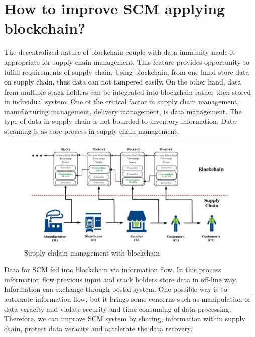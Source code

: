 \section{How to improve SCM applying blockchain? }
The decentralized nature of blockchain couple with data immunity made it appropriate for supply chain management.
This feature provides opportunity to fulfill requirements of supply chain.  
Using blockchain, from one hand store data on supply chain, thus data can not tampered easily. On the other hand, data from multiple stack holders can be integrated into blockchain rather then stored in individual system.
One of the critical factor in supply chain management, manufacturing management, delivery management, is data management. The type of data in supply chain is not bounded to inventory information. Data steaming is as core process in supply chain management.
\begin{center}
	
	\begin{figure}[htb!]
		
		\begin{minipage}{0.55\linewidth}
			
			\includegraphics[width=1.85\textwidth]{images/chap03_SupplyChain_blockchain.png}
		\end{minipage}
		\caption{Supply chdain management with blockchain\cite{Nazmul}}
		
	\end{figure}
	
\end{center}
Data for SCM fed into blockchain via information flow. In this process information flow previous input and stack holders store data in off-line way. Information can exchange through postal system. One possible way is to automate information flow, but it brings some concerns such as manipulation of data veracity and violate security and time consuming of data processing. Therefore, we can improve SCM system by sharing, information within supply chain, protect data veracity and accelerate the data recovery.\\
